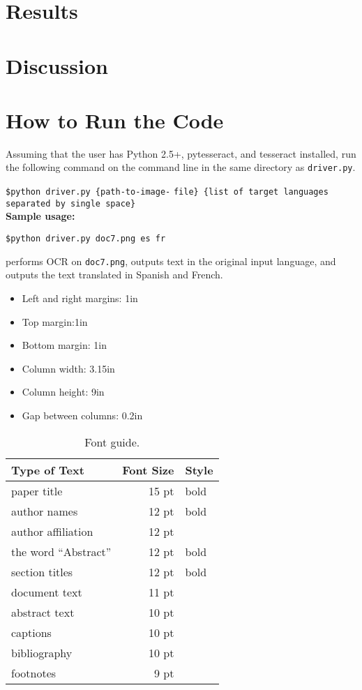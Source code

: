 \documentclass[11pt,letterpaper]{article}
\begin{document}
\section{Results}

\section{Discussion}

\section{How to Run the Code}

Assuming that the user has Python 2.5+, pytesseract, and tesseract installed, run the following command on the command line in the same directory as {\tt driver.py}.

{\tt \$python driver.py \{path-to-image-} {\tt file\} \{list of target languages separated by single space\}}\\

\textbf{Sample usage:}

{\tt \$python driver.py doc7.png es fr}

performs OCR on {\tt doc7.png}, outputs text in the original input language, and outputs the text translated in Spanish and French.


\begin{itemize}
\item Left and right margins: 1in
\item Top margin:1in
\item Bottom margin: 1in
\item Column width: 3.15in
\item Column height: 9in
\item Gap between columns: 0.2in
\end{itemize}


\begin{table}
\begin{center}
\begin{tabular}{|l|rl|}
\hline \bf Type of Text & \bf Font Size & \bf Style \\ \hline
paper title & 15 pt & bold \\
author names & 12 pt & bold \\
author affiliation & 12 pt & \\
the word ``Abstract'' & 12 pt & bold \\
section titles & 12 pt & bold \\
document text & 11 pt  &\\
abstract text & 10 pt & \\
captions & 10 pt & \\
bibliography & 10 pt & \\
footnotes & 9 pt & \\
\hline
\end{tabular}
\end{center}
\caption{\label{font-table} Font guide. }
\end{table}
\end{document}
